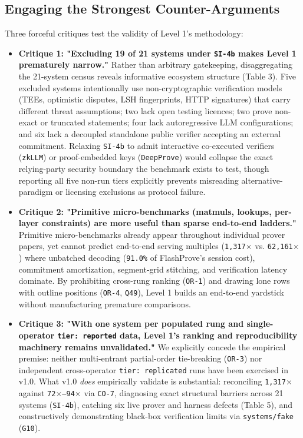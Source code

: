 \documentclass[11pt,letterpaper]{article}
\begin{document}
\subsection{Engaging the Strongest Counter-Arguments}

Three forceful critiques test the validity of Level 1's methodology:

\begin{itemize}
\item \textbf{Critique 1: "Excluding 19 of 21 systems under \texttt{SI-4b} makes Level 1 prematurely narrow."} Rather than arbitrary gatekeeping, disaggregating the 21-system census reveals informative ecosystem structure (Table 3). Five excluded systems intentionally use non-cryptographic verification models (TEEs, optimistic disputes, LSH fingerprints, HTTP signatures) that carry different threat assumptions; two lack open testing licences; two prove non-exact or truncated statements; four lack autoregressive LLM configurations; and six lack a decoupled standalone public verifier accepting an external commitment. Relaxing \texttt{SI-4b} to admit interactive co-executed verifiers (\texttt{zkLLM}) or proof-embedded keys (\texttt{DeepProve}) would collapse the exact relying-party security boundary the benchmark exists to test, though reporting all five non-run tiers explicitly prevents misreading alternative-paradigm or licensing exclusions as protocol failure.
\item \textbf{Critique 2: "Primitive micro-benchmarks (matmuls, lookups, per-layer constraints) are more useful than sparse end-to-end ladders."} Primitive micro-benchmarks already appear throughout individual prover papers, yet cannot predict end-to-end serving multiples (\texttt{1,317$\times$} vs. \texttt{62,161$\times$}) where unbatched decoding (\texttt{91.0\%} of FlashProve's session cost), commitment amortization, segment-grid stitching, and verification latency dominate. By prohibiting cross-rung ranking (\texttt{OR-1}) and drawing lone rows with outline positions (\texttt{OR-4}, \texttt{Q49}), Level 1 builds an end-to-end yardstick without manufacturing premature comparisons.
\item \textbf{Critique 3: "With one system per populated rung and single-operator \texttt{tier: reported} data, Level 1's ranking and reproducibility machinery remains unvalidated."} We explicitly concede the empirical premise: neither multi-entrant partial-order tie-breaking (\texttt{OR-3}) nor independent cross-operator \texttt{tier: replicated} runs have been exercised in v1.0. What v1.0 \textit{does} empirically validate is substantial: reconciling \texttt{1,317$\times$} against \texttt{72$\times$--94$\times$} via \texttt{CO-7}, diagnosing exact structural barriers across 21 systems (\texttt{SI-4b}), catching six live prover and harness defects (Table 5), and constructively demonstrating black-box verification limits via \texttt{systems/\allowbreak{}fake} (\texttt{G10}).
\end{itemize}
\end{document}
